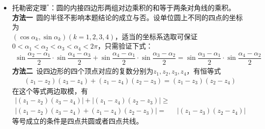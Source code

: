 \begin{itemize}[leftmargin=\inteval{\myitemleftmargin}pt,itemsep=
   \inteval{\myitemitempsep}pt,topsep=\inteval{\myitemtopsep}pt]
\item 托勒密定理$ ^* $：圆的内接四边形两组对边乘积的和等于两条对角线的乘积。\\
\textbf{方法一}\ 圆的半径不影响本题结论的成立与否。设单位圆上不同的四点的坐标为 \\
$ (\cos \alpha_k,\sin \alpha_k)(k=1,2,3,4) $，适当的坐标系选取可保证
$ 0< \alpha_1 <\alpha_2<\alpha_3<\alpha_4<2\pi $，只需验证下式：
\begin{align*}
    \sin\dfrac{\alpha_2-\alpha_1}{2}\cdot 
    \sin\dfrac{\alpha_4-\alpha_3}{2}+\sin\dfrac{\alpha_4-\alpha_1}{2}\cdot
    \sin\dfrac{\alpha_3-\alpha_2}{2}=\sin\dfrac{\alpha_3-\alpha_1}{2}\cdot 
    \sin\dfrac{\alpha_4-\alpha_2}{2}
\end{align*}
\textbf{方法二}\ 设四边形的四个顶点对应的复数分别为$ z_1,z_2,z_3,z_4 $，有恒等式
\begin{align*}
    (z_1-z_2)(z_3-z_4)+(z_1-z_4)(z_2-z_3)=(z_1-z_3)(z_2-z_4)
\end{align*}
在这个等式两边取模，有
\begin{align*}
    |(z_1-z_2)(z_3-z_4)|+|(z_1-z_4)(z_2-z_3)|\geq &\  \\
    |(z_1-z_2)(z_3-z_4)+(z_1-z_4)(z_2-z_3)|=&\ |(z_1-z_3)(z_2-z_4)|
\end{align*}
等号成立的条件是四点共圆或者四点共线。


\end{itemize}
